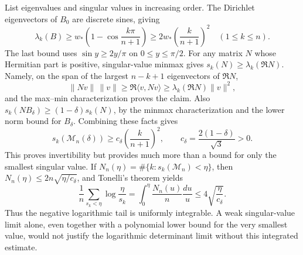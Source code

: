\documentclass[11pt,letterpaper]{article}
\theoremstyle{remark}\newtheorem{remark}[theorem]{Remark}
\begin{document}
List eigenvalues and singular values in increasing order. The
Dirichlet eigenvectors of $B_0$ are discrete sines, giving
\begin{equation}\label{dsasm:pr:eigenlower}
 \lambda_k(B)\ge w_*\left(1-\cos\frac{k\pi}{n+1}\right)
 \ge2w_*\left(\frac{k}{n+1}\right)^2\quad(1\le k\le n).
\end{equation}
The last bound uses $\sin y\ge2y/\pi$ on $0\le y\le\pi/2$.
For any matrix $N$ whose Hermitian part is positive, singular-value
minmax gives $s_k(N)\ge\lambda_k(\Re N)$. Namely, on the span of
the largest $n-k+1$ eigenvectors of $\Re N$,
\[
 \|Nv\|\,\|v\|\ge\Re\langle v,Nv\rangle
 \ge\lambda_k(\Re N)\|v\|^2,
\]
and the max--min characterization proves the claim.
Also $s_k(NB_\delta)\ge(1-\delta)s_k(N)$, by the minmax
characterization and the lower norm bound for $B_\delta$.
Combining these facts gives
\begin{equation}\label{dsasm:pr:singularlower}
 s_k(\mathcal M_n(\delta))\ge
 c_\delta\left(\frac{k}{n+1}\right)^2,
 \qquad c_\delta=\frac{2(1-\delta)}{\sqrt3}>0.
\end{equation}
This proves invertibility but provides much more than a bound for
only the smallest singular value. If
$N_n(\eta)=\#\{k:s_k(\mathcal M_n)<\eta\}$, then
$N_n(\eta)\le2n\sqrt{\eta/c_\delta}$, and Tonelli's theorem yields
\begin{equation}\label{dsasm:pr:logtail}
 \frac1n\sum_{s_k<\eta}\log\frac\eta{s_k}
 =\int_0^\eta\frac{N_n(u)}n\frac{du}{u}
 \le4\sqrt{\frac\eta{c_\delta}}.
\end{equation}
Thus the negative logarithmic tail is uniformly integrable. A weak
singular-value limit alone, even together with a polynomial lower
bound for the very smallest value, would not justify the logarithmic
determinant limit without this integrated estimate.
\end{document}
